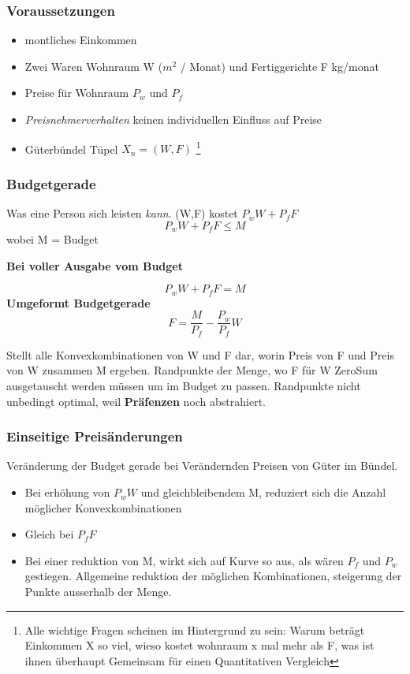 \subsubsection{Voraussetzungen}
\begin{itemize}
    \item montliches Einkommen
    \item Zwei Waren Wohnraum W ($m^2$ / Monat) und Fertiggerichte F kg/monat
    \item Preise für Wohnraum $P_w$ und $P_f$
    \item \textit{Preisnehmerverhalten} keinen individuellen Einfluss auf Preise
    \item Güterbündel Tüpel $X_n = (W,F)$ \footnote{Alle wichtige Fragen scheinen im Hintergrund zu sein: Warum beträgt Einkommen X so viel, wieso kostet wohnraum x mal mehr als F, was ist ihnen überhaupt Gemeinsam für einen Quantitativen Vergleich }
\end{itemize}

\subsubsection{Budgetgerade}
\begin{definition}
    [Budgetbedingung] Was eine Person sich leisten \textit{kann}. (W,F) kostet $P_wW + P_fF$
    \begin{equation}
         P_wW+P_fF \le M
    \end{equation} wobei M = Budget
\end{definition}

\begin{definition}
    [Budgetgerade]
 \textbf{Bei voller Ausgabe vom Budget}

    \begin{equation}
        P_wW + P_fF = M
    \end{equation}
    \textbf{Umgeformt Budgetgerade}
    \begin{equation}
        F = \frac{M}{P_f} - \frac{P_w}{P_f}W
    \end{equation}
\end{definition}
Stellt alle Konvexkombinationen von W und F dar, worin Preis von F und Preis von W zusammen M ergeben. Randpunkte der Menge, wo F für W ZeroSum ausgetauscht werden müssen um im Budget zu passen. Randpunkte nicht unbedingt optimal, weil \textbf{Präfenzen} noch abstrahiert.

\subsubsection{Einseitige Preisänderungen}
Veränderung der Budget gerade bei Verändernden Preisen von Güter im Bündel.
\begin{itemize}
    \item Bei erhöhung von $P_wW$ und gleichbleibendem M, reduziert sich die Anzahl möglicher Konvexkombinationen
    \item Gleich bei $P_fF$
    \item Bei einer reduktion von M, wirkt sich auf Kurve so aus, als wären $P_f$ und $P_w$ gestiegen. Allgemeine reduktion der möglichen Kombinationen, steigerung der Punkte ausserhalb der Menge.
\end{itemize}

